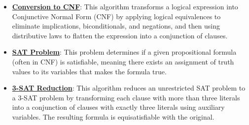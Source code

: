 \documentclass{article}%
\begin{document}
\begin{itemize}[leftmargin=*]%
\item \href{https://purdue.brightspace.com/d2l/common/assets/pdfjs-d2l-dist/1.0.14-legacy/web/viewer.html?file=\%2Fcontent\%2Fenforced\%2F1095467-wl.202510.CS.24300.001\%2F13L1-Logic.pdf\%3Fou\%3D1095467\&lang=en-us\&container=d2l-fileviewer-rendered-pdf\&fullscreen=d2l-fileviewer-rendered-pdf-dialog\&height=667#page=17}{\textbf{Conversion to CNF}}: This algorithm transforms a logical expression into Conjunctive Normal Form (CNF) by applying logical equivalences to eliminate implications, biconditionals, and negations, and then using distributive laws to flatten the expression into a conjunction of clauses.%
\item \href{https://purdue.brightspace.com/d2l/common/assets/pdfjs-d2l-dist/1.0.14-legacy/web/viewer.html?file=\%2Fcontent\%2Fenforced\%2F1095467-wl.202510.CS.24300.001\%2F13L1-Logic.pdf\%3Fou\%3D1095467\&lang=en-us\&container=d2l-fileviewer-rendered-pdf\&fullscreen=d2l-fileviewer-rendered-pdf-dialog\&height=667#page=15}{\textbf{SAT Problem}}: This problem determines if a given propositional formula (often in CNF) is satisfiable, meaning there exists an assignment of truth values to its variables that makes the formula true.%
\item \href{https://purdue.brightspace.com/d2l/common/assets/pdfjs-d2l-dist/1.0.14-legacy/web/viewer.html?file=\%2Fcontent\%2Fenforced\%2F1095467-wl.202510.CS.24300.001\%2F13L1-Logic.pdf\%3Fou\%3D1095467\&lang=en-us\&container=d2l-fileviewer-rendered-pdf\&fullscreen=d2l-fileviewer-rendered-pdf-dialog\&height=667#page=24}{\textbf{3{-}SAT Reduction}}: This algorithm reduces an unrestricted SAT problem to a 3-SAT problem by transforming each clause with more than three literals into a conjunction of clauses with exactly three literals using auxiliary variables. The resulting formula is equisatisfiable with the original.%
\end{itemize}%
\end{document}

